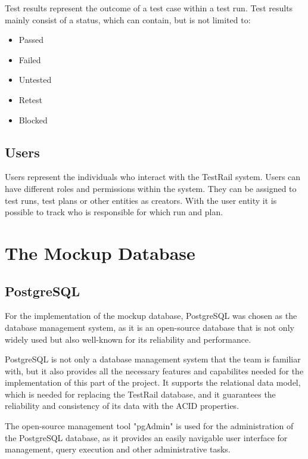 Test results represent the outcome of a test case within a test run. Test results mainly consist of a status, which can contain, but is not limited to:

\begin{itemize}
    \item Passed
    \item Failed
    \item Untested
    \item Retest
    \item Blocked
\end{itemize}

\subsection{Users}

Users represent the individuals who interact with the TestRail system. Users can have different roles and permissions within the system. They can be assigned to test runs, test plans or other entities as creators. With the user entity it is possible to track who is responsible for which run and plan.

\section{The Mockup Database}

\subsection{PostgreSQL}

For the implementation of the mockup database, PostgreSQL was chosen as the database management system, as it is an open-source database that is not only widely used but also well-known for its reliability and performance. 

PostgreSQL is not only a database management system that the team is familiar with, but it also provides all the necessary features and capabilites needed for the implementation of this part of the project. It supports the relational data model, which is needed for replacing the TestRail database, and it guarantees the reliability and consistency of its data with the ACID properties.

The open-source management tool "pgAdmin" is used for the administration of the PostgreSQL database, as it provides an easily navigable user interface for management, query execution and other administrative tasks.

